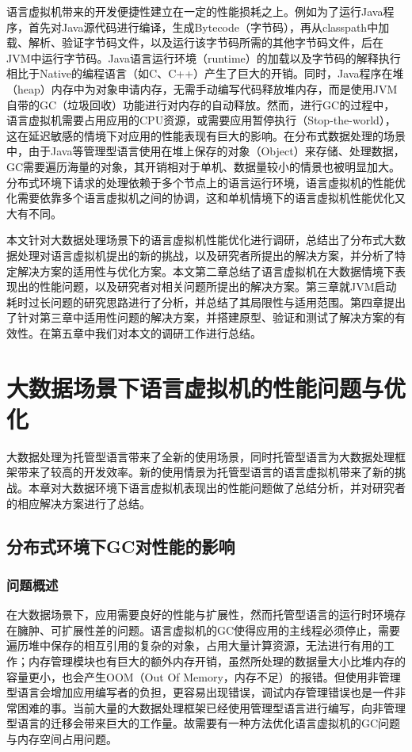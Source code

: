 \documentclass[lang=cn,11pt,a4paper,cite=authoryear]{elegantpaper}
\begin{document}
语言虚拟机带来的开发便捷性建立在一定的性能损耗之上。例如为了运行Java程序，首先对Java源代码进行编译，生成Bytecode（字节码），再从classpath中加载、解析、验证字节码文件，以及运行该字节码所需的其他字节码文件，后在JVM中运行字节码。Java语言运行环境（runtime）的加载以及字节码的解释执行相比于Native的编程语言（如C、C++）产生了巨大的开销。同时，Java程序在堆（heap）内存中为对象申请内存，无需手动编写代码释放堆内存，而是使用JVM自带的GC（垃圾回收）功能进行对内存的自动释放。然而，进行GC的过程中，语言虚拟机需要占用应用的CPU资源，或需要应用暂停执行（Stop-the-world），这在延迟敏感的情境下对应用的性能表现有巨大的影响。在分布式数据处理的场景中，由于Java等管理型语言使用在堆上保存的对象（Object）来存储、处理数据，GC需要遍历海量的对象，其开销相对于单机、数据量较小的情景也被明显加大。分布式环境下请求的处理依赖于多个节点上的语言运行环境，语言虚拟机的性能优化需要依靠多个语言虚拟机之间的协调，这和单机情境下的语言虚拟机性能优化又大有不同。

本文针对大数据处理场景下的语言虚拟机性能优化进行调研，总结出了分布式大数据处理对语言虚拟机提出的新的挑战，以及研究者所提出的解决方案，并分析了特定解决方案的适用性与优化方案。本文第二章总结了语言虚拟机在大数据情境下表现出的性能问题，以及研究者对相关问题所提出的解决方案。第三章就JVM启动耗时过长问题的研究思路进行了分析，并总结了其局限性与适用范围。第四章提出了针对第三章中适用性问题的解决方案，并搭建原型、验证和测试了解决方案的有效性。在第五章中我们对本文的调研工作进行总结。

\section{大数据场景下语言虚拟机的性能问题与优化}
大数据处理为托管型语言带来了全新的使用场景，同时托管型语言为大数据处理框架带来了较高的开发效率。新的使用情景为托管型语言的语言虚拟机带来了新的挑战。本章对大数据环境下语言虚拟机表现出的性能问题做了总结分析，并对研究者的相应解决方案进行了总结。

\subsection{分布式环境下GC对性能的影响}
\subsubsection{问题概述}
在大数据场景下，应用需要良好的性能与扩展性，然而托管型语言的运行时环境存在臃肿、可扩展性差的问题。语言虚拟机的GC使得应用的主线程必须停止，需要遍历堆中保存的相互引用的复杂的对象，占用大量计算资源，无法进行有用的工作；内存管理模块也有巨大的额外内存开销，虽然所处理的数据量大小比堆内存的容量更小，也会产生OOM（Out Of Memory，内存不足）的报错。但使用非管理型语言会增加应用编写者的负担，更容易出现错误，调试内存管理错误也是一件非常困难的事。当前大量的大数据处理框架已经使用管理型语言进行编写，向非管理型语言的迁移会带来巨大的工作量。故需要有一种方法优化语言虚拟机的GC问题与内存空间占用问题。
\end{document}
